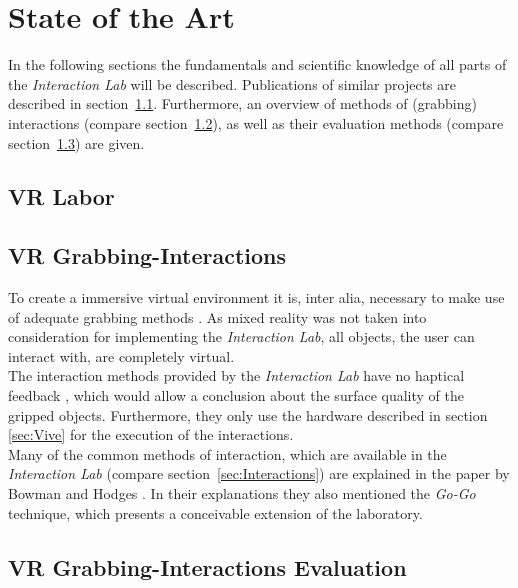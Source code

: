 \section{State of the Art} \label{sec:StateOfTheArt}
In the following sections the fundamentals and scientific knowledge of all parts of the \textit{Interaction Lab} will be described. Publications of similar projects are described in section~\ref{sec:SOTALabor}. Furthermore, an overview of methods of  (grabbing) interactions (compare section~\ref{sec:SOTAInteractions}), as well as their evaluation methods (compare section~\ref{sec:SOTAInteractionEvalutiom}) are given. 


\subsection{VR Labor}\label{sec:SOTALabor}

\subsection{VR Grabbing-Interactions}\label{sec:SOTAInteractions}
To create a immersive virtual environment it is, inter alia, necessary to make use of adequate grabbing methods \cite{Bowman}. As mixed reality was not taken into consideration for implementing the \textit{Interaction Lab}, all objects, the user can interact with, are completely virtual. \\
The interaction methods provided by the \textit{Interaction Lab} have no haptical feedback \cite{768179}, which would allow a conclusion about the surface quality of the gripped objects. Furthermore, they only use the hardware described in section \ref{sec:Vive} for the execution of the interactions. \\
Many of the common methods of interaction, which are available in the \textit{Interaction Lab} (compare section~\ref {sec:Interactions}) are explained in the paper by Bowman and Hodges \cite{Bowman}. In their explanations they also mentioned the  \textit{Go-Go} technique, which presents a conceivable extension of the laboratory.

\subsection{VR Grabbing-Interactions Evaluation}\label{sec:SOTAInteractionEvalutiom}

\newpage
